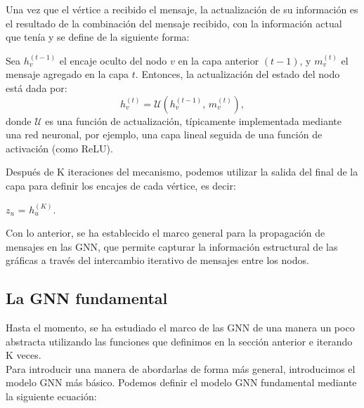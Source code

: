 Una vez que el vértice a recibido el mensaje, la actualización de su información es el resultado de la combinación del mensaje recibido, con la información actual que tenía y se define de la siguiente forma:

\begin{definition}
    Sea $h_v^{(t-1)}$ el encaje oculto del nodo $v$ en la capa anterior $(t-1)$, y $m_v^{(t)}$ el mensaje agregado en la capa $t$. Entonces, la actualización del estado del nodo está dada por:
    \[
        h_v^{(t)} = \mathscr{U}\!\left(h_v^{(t-1)},\, m_v^{(t)}\right),
    \]
    donde $\mathscr{U}$ es una función de actualización, típicamente implementada mediante una red neuronal, por ejemplo, una capa lineal seguida de una función de activación (como ReLU).
\end{definition}

Después de K iteraciones del mecanismo, podemos utilizar la salida del final de la capa para definir los encajes de cada vértice, es decir:

\begin{center}
    $z_u$ = $h_u^{(K)}$.
\end{center}

Con lo anterior, se ha establecido el marco general para la propagación de mensajes en las GNN, que permite capturar la información estructural de las gráficas a través del intercambio iterativo de mensajes entre los nodos.

\subsection{La GNN fundamental}
Hasta el momento, se ha estudiado el marco de las GNN de una manera un poco abstracta utilizando las funciones que definimos en la sección anterior e iterando K veces.\\
Para introducir una manera de abordarlas de forma más general, introducimos el modelo GNN más básico.
Podemos definir el modelo GNN fundamental mediante la siguiente ecuación:

